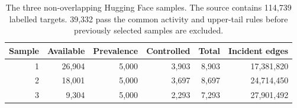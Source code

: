 \begin{table}[ht]
\centering
\caption{The three non-overlapping Hugging Face samples. The source contains 114,739 labelled targets. 39,332 pass the common activity and upper-tail rules before previously selected samples are excluded.}
\label{tab:res_cohorts}
\footnotesize
\begin{tabular}{@{}r r r r r r@{}}
\toprule
\textbf{Sample} & \textbf{Available} & \textbf{Prevalence} & \textbf{Controlled} & \textbf{Total} & \textbf{Incident edges} \\
\midrule
1 & 26,904 & 5,000 & 3,903 & 8,903 & 17,381,820 \\
2 & 18,001 & 5,000 & 3,697 & 8,697 & 24,714,450 \\
3 & 9,304 & 5,000 & 2,293 & 7,293 & 27,901,492 \\
\bottomrule
\end{tabular}
\end{table}
